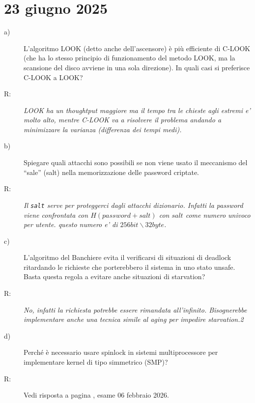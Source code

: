 \documentclass[a4paper,12pt]{article}
\newcommand{\datasection}[1]{%
    \section*{#1}%
    \addcontentsline{toc}{section}{#1}%
}
\newenvironment{exambox}{%
    \begin{mdframed}[
        linecolor=black!70,
        linewidth=0.6pt,
        innerleftmargin=8pt,
        innerrightmargin=8pt,
        innertopmargin=6pt,
        innerbottommargin=6pt
    ]
    \begin{description}
}{%
    \end{description}
    \end{mdframed}
}
\begin{document}
\newpage
\datasection{23 giugno 2025}
\begin{exambox}
\item[a)] L'algoritmo LOOK (detto anche dell'ascensore) è più efficiente di C-LOOK (che ha lo stesso principio di funzionamento del metodo LOOK, ma la scansione del disco avviene in una sola direzione). In quali casi si preferisce C-LOOK a LOOK?
\item[R:]\textit{LOOK ha un thoughtput maggiore ma il tempo tra le chieste agli estremi e' molto alto, mentre C-LOOK va a risolvere il problema andando a minimizzare la varianza (differenza dei tempi medi).}
\item[b)] Spiegare quali attacchi sono possibili se non viene usato il meccanismo del ``sale'' (salt) nella memorizzazione delle password criptate.
\item[R:] \textit{Il \texttt{salt} serve per proteggerci dagli attacchi dizionario. Infatti la password viene confrontata con $H(password + salt)$ con $salt$ come numero univoco per utente. questo numero e' di $256bit \backslash 32byte$.}
\item[c)] L'algoritmo del Banchiere evita il verificarsi di situazioni di deadlock ritardando le richieste che porterebbero il sistema in uno stato unsafe. Basta questa regola a evitare anche situazioni di starvation?
\item[R:] \textit{No, infatti la richiesta potrebbe essere rimandata all'infinito. Bisognerebbe implementare anche una tecnica simile al aging per impedire starvation.2}
\item[d)] Perché è necessario usare spinlock in sistemi multiprocessore per implementare kernel di tipo simmetrico (SMP)?
\item[R:] Vedi risposta a pagina \pageref{risposta:spinlock}, esame 06 febbraio 2026.
\end{exambox}
\end{document}
